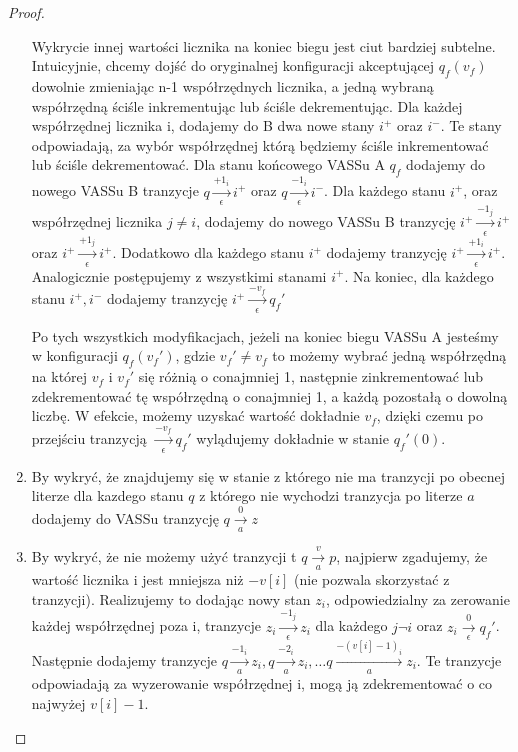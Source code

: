 \documentclass[magisterska]{pracamgr}
\newtheorem{proof}[theorem]{Dowód}
\begin{document}
\begin{proof}
\begin{enumerate}
            Wykrycie innej wartości licznika na koniec biegu jest ciut bardziej subtelne.
            Intuicyjnie, chcemy dojść do oryginalnej konfiguracji akceptującej $q_f(v_f)$ dowolnie zmieniając n-1 współrzędnych licznika,
            a jedną wybraną współrzędną ściśle inkrementując lub ściśle dekrementując.
            Dla każdej współrzędnej licznika i, dodajemy do B dwa nowe stany $i^+$ oraz $i^-$.
            Te stany odpowiadają, za wybór współrzędnej którą będziemy ściśle inkrementować lub ściśle dekrementować.
            Dla stanu końcowego VASSu A $q_f$ dodajemy do nowego VASSu B tranzycje $q \xrightarrow[\epsilon]{+1_i} i^+$ oraz
            $q \xrightarrow[\epsilon]{-1_i} i^-$.
            Dla każdego stanu $i^+$, oraz współrzędnej licznika $j \neq i$, dodajemy do nowego VASSu B tranzycję
            $i^+ \xrightarrow[\epsilon]{-1_j} i^+$ oraz $i^+ \xrightarrow[\epsilon]{+1_j} i^+$.
            Dodatkowo dla każdego stanu $i^+$ dodajemy tranzycję  $i^+ \xrightarrow[\epsilon]{+1_i} i^+$.
            Analogicznie postępujemy z wszystkimi stanami $i^+$.
            Na koniec, dla każdego stanu $i^+,i^-$ dodajemy tranzycję $i^+ \xrightarrow[\epsilon]{-v_f} q_f'$

            Po tych wszystkich modyfikacjach, jeżeli na koniec biegu VASSu A jesteśmy w konfiguracji $q_f(v_f')$,
            gdzie $v_f' \neq v_f$ to możemy wybrać jedną współrzędną na której $v_f$ i $v_f'$ się różnią o conajmniej 1,
            następnie zinkrementować lub zdekrementować tę współrzędną o conajmniej 1, a każdą pozostałą o dowolną liczbę.
            W efekcie, możemy uzyskać wartość dokładnie $v_f$, dzięki czemu po przejściu tranzycją
            $\xrightarrow[\epsilon]{-v_f} q_f'$ wylądujemy dokładnie w stanie $q_f'(0).$

            \item By wykryć, że znajdujemy się w stanie z którego nie ma tranzycji po obecnej literze dla kazdego stanu
            $q$ z którego nie wychodzi tranzycja po literze $a$ dodajemy do VASSu tranzycję $ q \xrightarrow[a]{0} z$

            \item By wykryć, że nie możemy użyć tranzycji t $q \xrightarrow[a]{v} p$, najpierw zgadujemy, że wartość licznika
            i jest mniejsza niż $-v[i]$ (nie pozwala skorzystać z tranzycji).
            Realizujemy to dodając nowy stan $z_i$, odpowiedzialny za zerowanie każdej współrzędnej poza i, tranzycje
            $z_i \xrightarrow[\epsilon]{-1_j} z_i$ dla każdego $j \neg i$ oraz $z_i \xrightarrow[\epsilon]{0} q_f'$.
            Następnie dodajemy tranzycje $q \xrightarrow[a]{-1_i} z_i, q \xrightarrow[a]{-2_i} z_i, \dots q \xrightarrow[a]{-(v[i]-1)_i} z_i$.
            Te tranzycje odpowiadają za wyzerowanie współrzędnej i, mogą ją zdekrementować o co najwyżej $v[i]-1$.

        \end{enumerate}


    \end{proof}
\end{document}
